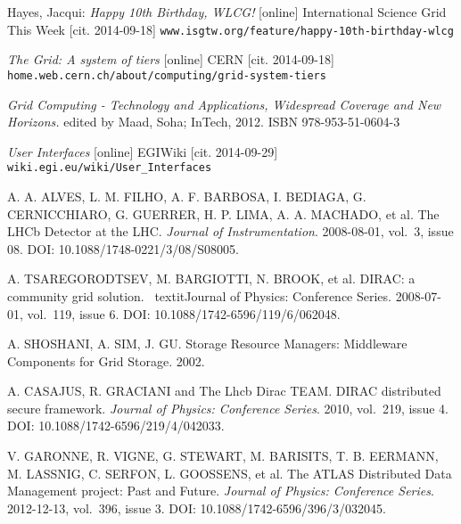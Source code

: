 
\def\bibname{Bibliography}
\begin{thebibliography}{99}
\addcontentsline{toc}{chapter}{\bibname}


	Hayes, Jacqui: 
	\emph{Happy 10th Birthday, WLCG!} [online]
	International Science Grid This Week [cit. 2014-09-18]
	\texttt{www.isgtw.org/feature/happy-10th-birthday-wlcg}

	\emph{The Grid: A system of tiers} [online] 
	CERN [cit. 2014-09-18]
	\texttt{home.web.cern.ch/about/computing/grid-system-tiers}

	\emph{Grid Computing - Technology and Applications, Widespread Coverage and New Horizons.} 
	edited by Maad, Soha; InTech, 2012.
	ISBN 978-953-51-0604-3

	\emph{User Interfaces} [online] 
	EGIWiki [cit. 2014-09-29]
	\texttt{wiki.egi.eu/wiki/User\_Interfaces}
	
	A. A. ALVES, L. M. FILHO, A. F. BARBOSA, I. BEDIAGA, G. CERNICCHIARO, G. GUERRER, H. P. LIMA, A. A. MACHADO, et al. 
	The LHCb Detector at the LHC.
	\textit{Journal of Instrumentation}. 
	2008-08-01, vol.~3, issue 08. 
	DOI: 10.1088/1748-0221/3/08/S08005.
	
	A. TSAREGORODTSEV, M. BARGIOTTI, N. BROOK, et al. 
	DIRAC: a community grid solution. \
	textit{Journal of Physics: Conference Series}. 2008-07-01, vol.~119, issue 6.
	DOI: 10.1088/1742-6596/119/6/062048.
	
	A. SHOSHANI,  A. SIM, J. GU. 
	Storage Resource Managers: Middleware Components for Grid Storage. 
	2002.

	A. CASAJUS,  R. GRACIANI and The Lhcb Dirac TEAM. 
	DIRAC distributed secure framework. 
	\textit{Journal of Physics: Conference Series}. 2010, vol.~219, issue 4. 
	DOI: 10.1088/1742-6596/219/4/042033. 
	
	V. GARONNE, R. VIGNE, G. STEWART, M. BARISITS, T. B. EERMANN, M. LASSNIG, C. SERFON, L. GOOSSENS, et al. 
	The ATLAS Distributed Data Management project: Past and Future. 
	\textit{Journal of Physics: Conference Series}. 2012-12-13, vol.~396, issue 3.
	DOI: 10.1088/1742-6596/396/3/032045. 
	

\end{thebibliography}
